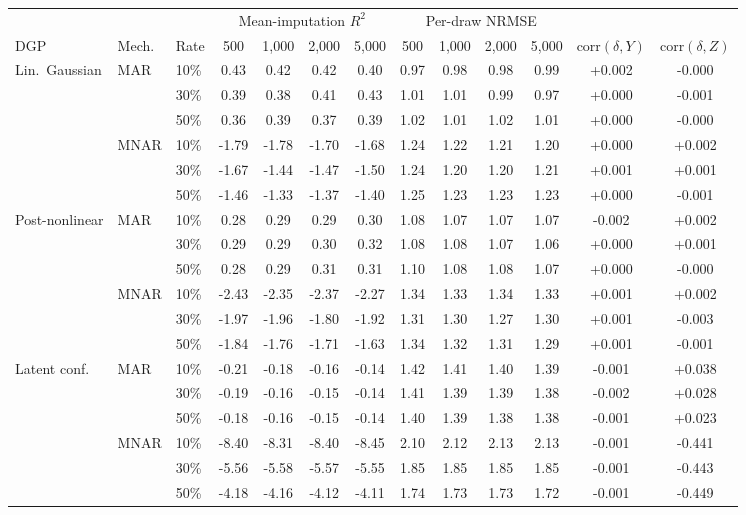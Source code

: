\begin{tabular}{lllcccccccccc}
    \toprule
     & & & \multicolumn{4}{c}{Mean-imputation $R^2$} & \multicolumn{4}{c}{Per-draw NRMSE} & & \\
    \cmidrule(lr){4-7} \cmidrule(lr){8-11}
    DGP & Mech. & Rate & 500 & 1{,}000 & 2{,}000 & 5{,}000 & 500 & 1{,}000 & 2{,}000 & 5{,}000 & $\mathrm{corr}(\delta,Y)$ & $\mathrm{corr}(\delta,Z)$ \\
    \midrule
    Lin.\ Gaussian   & MAR   & 10\% & 0.43 & 0.42 & 0.42 & 0.40 & 0.97 & 0.98 & 0.98 & 0.99 & +0.002 & -0.000 \\
                     &       & 30\% & 0.39 & 0.38 & 0.41 & 0.43 & 1.01 & 1.01 & 0.99 & 0.97 & +0.000 & -0.001 \\
                     &       & 50\% & 0.36 & 0.39 & 0.37 & 0.39 & 1.02 & 1.01 & 1.02 & 1.01 & +0.000 & -0.000 \\
                     & MNAR  & 10\% & -1.79 & -1.78 & -1.70 & -1.68 & 1.24 & 1.22 & 1.21 & 1.20 & +0.000 & +0.002 \\
                     &       & 30\% & -1.67 & -1.44 & -1.47 & -1.50 & 1.24 & 1.20 & 1.20 & 1.21 & +0.001 & +0.001 \\
                     &       & 50\% & -1.46 & -1.33 & -1.37 & -1.40 & 1.25 & 1.23 & 1.23 & 1.23 & +0.000 & -0.001 \\
    \midrule
    Post-nonlinear   & MAR   & 10\% & 0.28 & 0.29 & 0.29 & 0.30 & 1.08 & 1.07 & 1.07 & 1.07 & -0.002 & +0.002 \\
                     &       & 30\% & 0.29 & 0.29 & 0.30 & 0.32 & 1.08 & 1.08 & 1.07 & 1.06 & +0.000 & +0.001 \\
                     &       & 50\% & 0.28 & 0.29 & 0.31 & 0.31 & 1.10 & 1.08 & 1.08 & 1.07 & +0.000 & -0.000 \\
                     & MNAR  & 10\% & -2.43 & -2.35 & -2.37 & -2.27 & 1.34 & 1.33 & 1.34 & 1.33 & +0.001 & +0.002 \\
                     &       & 30\% & -1.97 & -1.96 & -1.80 & -1.92 & 1.31 & 1.30 & 1.27 & 1.30 & +0.001 & -0.003 \\
                     &       & 50\% & -1.84 & -1.76 & -1.71 & -1.63 & 1.34 & 1.32 & 1.31 & 1.29 & +0.001 & -0.001 \\
    \midrule
    Latent conf.     & MAR   & 10\% & -0.21 & -0.18 & -0.16 & -0.14 & 1.42 & 1.41 & 1.40 & 1.39 & -0.001 & +0.038 \\
                     &       & 30\% & -0.19 & -0.16 & -0.15 & -0.14 & 1.41 & 1.39 & 1.39 & 1.38 & -0.002 & +0.028 \\
                     &       & 50\% & -0.18 & -0.16 & -0.15 & -0.14 & 1.40 & 1.39 & 1.38 & 1.38 & -0.001 & +0.023 \\
                     & MNAR  & 10\% & -8.40 & -8.31 & -8.40 & -8.45 & 2.10 & 2.12 & 2.13 & 2.13 & -0.001 & -0.441 \\
                     &       & 30\% & -5.56 & -5.58 & -5.57 & -5.55 & 1.85 & 1.85 & 1.85 & 1.85 & -0.001 & -0.443 \\
                     &       & 50\% & -4.18 & -4.16 & -4.12 & -4.11 & 1.74 & 1.73 & 1.73 & 1.72 & -0.001 & -0.449 \\
    \bottomrule
\end{tabular}

